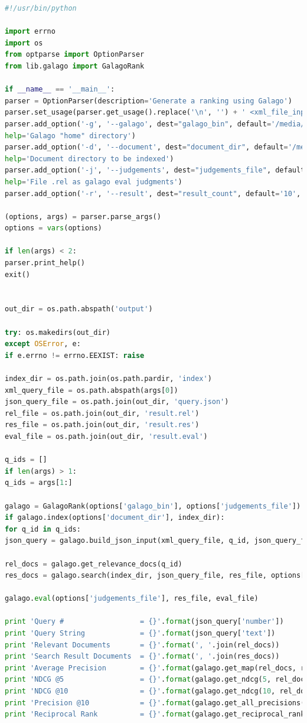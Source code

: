 \documentclass[letterpaper,11pt]{article}
\begin{document}
\begin{lstlisting}[language=python, caption={Code for question 8.3}, label={lst:83}]
#!/usr/bin/python

import errno
import os
from optparse import OptionParser
from lib.galago import GalagoRank

if __name__ == '__main__':
parser = OptionParser(description='Generate a ranking using Galago')
parser.set_usage(parser.get_usage().replace('\n', '') + ' <xml_file_input> [q1 ... qn]')
parser.add_option('-g', '--galago', dest="galago_bin", default='/media/erikaris/DATA/ODU/Semester_3/intro_to_info_retrieval/galago/galago-3.10-bin/bin/galago',
help='Galago "home" directory')
parser.add_option('-d', '--document', dest="document_dir", default='/media/erikaris/DATA/ODU/Semester_3/intro_to_info_retrieval/assignments/a4/code-report/cacm',
help='Document directory to be indexed')
parser.add_option('-j', '--judgements', dest="judgements_file", default='/media/erikaris/DATA/ODU/Semester_3/intro_to_info_retrieval/assignments/a4/code-report/cacm.rel',
help='File .rel as galago eval judgments')
parser.add_option('-r', '--result', dest="result_count", default='10', help='Number of result')

(options, args) = parser.parse_args()
options = vars(options)

if len(args) < 2:
parser.print_help()
exit()


out_dir = os.path.abspath('output')

try: os.makedirs(out_dir)
except OSError, e:
if e.errno != errno.EEXIST: raise

index_dir = os.path.join(os.path.pardir, 'index')
xml_query_file = os.path.abspath(args[0])
json_query_file = os.path.join(out_dir, 'query.json')
rel_file = os.path.join(out_dir, 'result.rel')
res_file = os.path.join(out_dir, 'result.res')
eval_file = os.path.join(out_dir, 'result.eval')

q_ids = []
if len(args) > 1:
q_ids = args[1:]

galago = GalagoRank(options['galago_bin'], options['judgements_file'])
if galago.index(options['document_dir'], index_dir):
for q_id in q_ids:
json_query = galago.build_json_input(xml_query_file, q_id, json_query_file)

rel_docs = galago.get_relevance_docs(q_id)
res_docs = galago.search(index_dir, json_query_file, res_file, options['result_count'])

galago.eval(options['judgements_file'], res_file, eval_file)

print 'Query #                  = {}'.format(json_query['number'])
print 'Query String             = {}'.format(json_query['text'])
print 'Relevant Documents       = {}'.format(', '.join(rel_docs))
print 'Search Result Documents  = {}'.format(', '.join(res_docs))
print 'Average Precision        = {}'.format(galago.get_map(rel_docs, res_docs))
print 'NDCG @5                  = {}'.format(galago.get_ndcg(5, rel_docs, res_docs))
print 'NDCG @10                 = {}'.format(galago.get_ndcg(10, rel_docs, res_docs))
print 'Precision @10            = {}'.format(galago.get_all_precisions(rel_docs, res_docs)[9])
print 'Reciprocal Rank          = {}'.format(galago.get_reciprocal_rank(rel_docs, res_docs))



\end{lstlisting}
\end{document}
